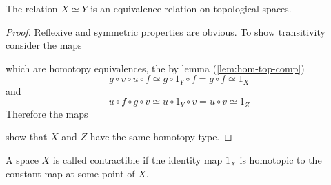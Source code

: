 \begin{lem}
    The relation $X \simeq Y$ is an equivalence relation on topological spaces.
\end{lem}

\begin{proof}
    Reflexive and symmetric properties are obvious. To show transitivity consider the maps
    \begin{center}
\qquad
    \end{center} 
    which are homotopy equivalences, the by lemma (\ref{lem:hom-top-comp})
    \[
        g \circ v \circ u \circ f \simeq g \circ 1_Y \circ f = g \circ f \simeq 1_X  
    \]
    and 
    \[
        u \circ f \circ g \circ v \simeq u \circ 1_Y \circ v = u \circ v \simeq 1_Z  
    \]
    Therefore the maps
    \begin{center}
    \end{center}
    show that $X$ and $Z$ have the same homotopy type.
\end{proof}

\begin{defn}
A space $X$ is called contractible if the identity map $1_X$ is homotopic to the constant map at some point of $X$.
\end{defn}

